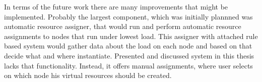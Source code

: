 \documentclass[11pt]{book}
\begin{document}
	
      In terms of the future work there are many improvements that might be implemented. Probably the largest component,
      which was initially plannned was automatic resource assigner, that would run and perform automatic resource
      assignments to nodes that run under lowest load. This assigner with attached rule based system would gather data
      about the load on each node and based on that decide what and where instantiate. Presented and discussed system in
      this thesis lacks that functionality. Instead, it offers manual assignments, where user selects on which node his
      virtual resources should be created.


  
  
\end{document}
